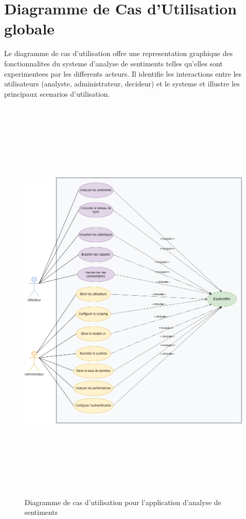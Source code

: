 \section{Diagramme de Cas d'Utilisation globale}

Le diagramme de cas d'utilisation offre une representation graphique des fonctionnalites du systeme d'analyse de sentiments telles qu'elles sont experimentees par les differents acteurs. Il identifie les interactions entre les utilisateurs (analyste, administrateur, decideur) et le systeme et illustre les principaux scenarios d'utilisation.

\begin{figure}[H]
\centering
\includegraphics[height=20cm , width=\textwidth]{assets/images/usecase.png}
\caption{Diagramme de cas d'utilisation pour l'application d'analyse de sentiments}
\label{fig:usecase-global}
\end{figure}

